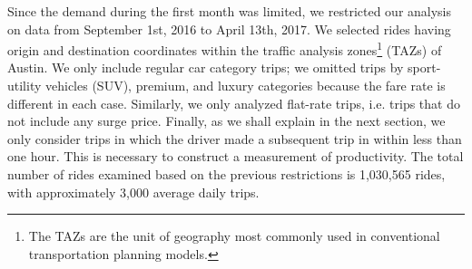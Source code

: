 \documentclass[11pt]{article}
\begin{document}
Since the demand during the first month was limited, we restricted our analysis on data from September 1st, 2016 to April 13th, 2017. We selected rides having origin and destination coordinates within the traffic analysis zones\footnote{The TAZs are the unit of geography most commonly used in conventional transportation planning models.} (TAZs) of Austin. We only include regular car category trips; we omitted trips by sport-utility vehicles (SUV), premium, and luxury categories because the fare rate is different in each case. Similarly, we only analyzed flat-rate trips, i.e. trips that do not include any surge price. Finally, as we shall explain in the next section, we only consider trips in which the driver made a subsequent trip in within less than one hour. This is necessary to construct a measurement of productivity. The total number of rides examined based on the previous restrictions is 1,030,565 rides, with approximately 3,000 average daily trips. 
\end{document}
